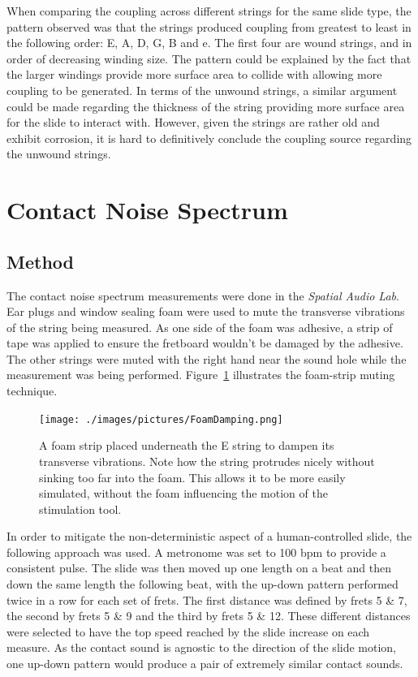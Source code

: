 \documentclass[../main.tex]{subfiles}
\begin{document}
When comparing the coupling across different strings for the same slide type, the pattern observed was that the strings produced coupling from greatest to least in the following order: E, A, D, G, B and e. The first four are wound strings, and in order of decreasing winding size. The pattern could be explained by the fact that the larger windings provide more surface area to collide with allowing more coupling to be generated. In terms of the unwound strings, a similar argument could be made regarding the thickness of the string providing more surface area for the slide to interact with. However, given the strings are rather old and exhibit corrosion, it is hard to definitively conclude the coupling source regarding the unwound strings.

\section{Contact Noise Spectrum}
\subsection{Method}
\label{subsec:Ch5CNSMethod}
The contact noise spectrum measurements were done in the \emph{Spatial Audio Lab}. Ear plugs and window sealing foam were used to mute the transverse vibrations of the string being measured. As one side of the foam was adhesive, a strip of tape was applied to ensure the fretboard wouldn't be damaged by the adhesive. The other strings were muted with the right hand near the sound hole while the measurement was being performed. Figure~\ref{fig:FoamStrip} illustrates the foam-strip muting technique.

\begin{figure}[h]
    \centering
    \texttt{[image: ./images/pictures/FoamDamping.png]}
    \caption{A foam strip placed underneath the E string to dampen its transverse vibrations. Note how the string protrudes nicely without sinking too far into the foam. This allows it to be more easily simulated, without the foam influencing the motion of the stimulation tool.}
    \label{fig:FoamStrip}
\end{figure}

In order to mitigate the non-deterministic aspect of a human-controlled slide, the following approach was used. A metronome was set to 100 bpm to provide a consistent pulse. The slide was then moved up one length on a beat and then down the same length the following beat, with the up-down pattern performed twice in a row for each set of frets. The first distance was defined by frets 5 \& 7, the second by frets 5 \& 9 and the third by frets 5 \& 12. These different distances were selected to have the top speed reached by the slide increase on each measure. As the contact sound is agnostic to the direction of the slide motion, one up-down pattern would produce a pair of extremely similar contact sounds.
\end{document}
